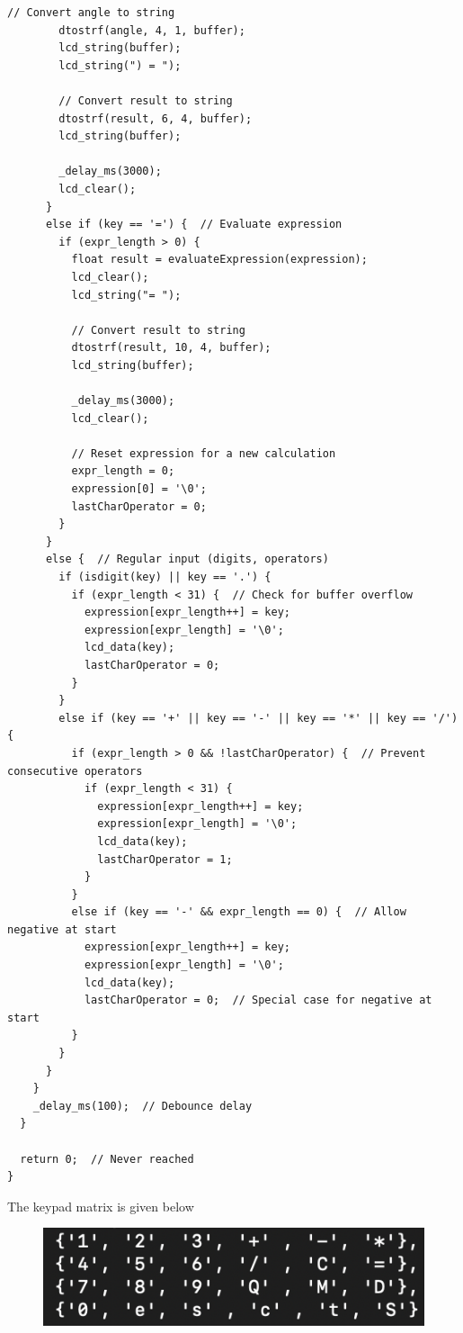 \documentclass[journal]{IEEEtran}
\begin{document}
\begin{lstlisting}[style=customC]
        // Convert angle to string
        dtostrf(angle, 4, 1, buffer);
        lcd_string(buffer);
        lcd_string(") = ");
        
        // Convert result to string
        dtostrf(result, 6, 4, buffer);
        lcd_string(buffer);
        
        _delay_ms(3000);
        lcd_clear();
      }
      else if (key == '=') {  // Evaluate expression
        if (expr_length > 0) {
          float result = evaluateExpression(expression);
          lcd_clear();
          lcd_string("= ");
          
          // Convert result to string
          dtostrf(result, 10, 4, buffer);
          lcd_string(buffer);
          
          _delay_ms(3000);
          lcd_clear();
          
          // Reset expression for a new calculation
          expr_length = 0;
          expression[0] = '\0';
          lastCharOperator = 0;
        }
      }
      else {  // Regular input (digits, operators)
        if (isdigit(key) || key == '.') {
          if (expr_length < 31) {  // Check for buffer overflow
            expression[expr_length++] = key;
            expression[expr_length] = '\0';
            lcd_data(key);
            lastCharOperator = 0;
          }
        }
        else if (key == '+' || key == '-' || key == '*' || key == '/') {
          if (expr_length > 0 && !lastCharOperator) {  // Prevent consecutive operators
            if (expr_length < 31) {
              expression[expr_length++] = key;
              expression[expr_length] = '\0';
              lcd_data(key);
              lastCharOperator = 1;
            }
          }
          else if (key == '-' && expr_length == 0) {  // Allow negative at start
            expression[expr_length++] = key;
            expression[expr_length] = '\0';
            lcd_data(key);
            lastCharOperator = 0;  // Special case for negative at start
          }
        }
      }
    }
    _delay_ms(100);  // Debounce delay
  }
  
  return 0;  // Never reached
}
\end{lstlisting}
The keypad matrix is given below
\begin{figure}[H]
    \centering
    \includegraphics[width=0.5\linewidth]{figs/keypadlayout.png}
\end{figure}
\end{document}
